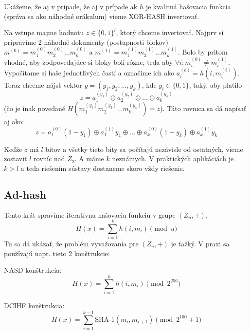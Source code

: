 Ukážeme, že aj v prípade, že aj v prípade ak $h$ je kvalitná hašovacia funkcia
(správa sa ako náhodné orákulum) vieme XOR-HASH invertovať.

Na vstupe majme hodnotu $z \in \{0,1\}^l$, ktorý chceme invertovať.
Najprv si pripravíme 2 náhodné dokumenty (postupnosti blokov)
$m^{(0)} = m_1^{(0)} m_2^{(0)} \dots m_k^{(0)}$ a 
$m^{(1)} = m_1^{(1)} m_2^{(1)} \dots m_k^{(1)}$. Bolo by pritom
vhodné, aby zodpovedajúce si bloky boli rôzne, teda aby $\forall i:
m_i^{(0)} \ne m_i^{(1)}$.
Vypočítame si haše jednotlivých častí a označíme ich ako
$a_i^{(b)} = h(i, m_i^{(b)})$. 
Teraz chceme nájsť vektor $y = (y_1,y_2, \dots ,y_k)$, kde $y_i \in \{0,1\}$,
taký, aby platilo 
\begin{equation*}
    z = a_1^{(y_1)} \oplus a_2^{(y_2)} \oplus \dots \oplus a_k^{(y_k)}
\end{equation*}
(čo je inak povedané $H(m_1^{(y_1)} m_2^{(y_2)} \dots m_k^{(y_k)}) = z$).
Táto rovnica sa dá napísať aj ako:
\begin{equation*}
    z = a_1^{(0)} (1 - y_1) \oplus a_1^{(1)} y_1 \oplus \dots 
        \oplus a_k^{(0)} (1 - y_k) \oplus a_k^{(1)} y_k
\end{equation*}

Keďže $z$ má $l$ bitov a všetky tieto bity sa počítajú nezávisle od
ostatných, vieme zostaviť $l$ rovníc nad $Z_2$. 
A máme $k$ neznámych.
V praktických aplikáciách je $k > l$ 
a teda riešením sústavy dostaneme skoro vždy riešenie.


\subsection{Ad-hash}

Tento krát spravíme iteratívnu hašovaciu funkciu v grupe $(Z_u, +)$.
\begin{equation*}
    H(x) = \sum_{i=1}^k h(i, m_i) \pmod{u}
\end{equation*}
Tu sa dá ukázať, že problém vyvažovania pre $(Z_u, +)$ je ťažký. 
V praxi sa používajú napr. tieto 2 konštrukcie:

NASD konštrukcia:
\begin{equation*}
    H(x) = \sum_{i=1}^k h(i, m_i) \pmod{2^{256}}
\end{equation*}

DCIHF konštrukcia:
\begin{equation*}
    H(x) = \sum_{i=1}^{k-1} \textrm{SHA-1}(m_i, m_{i+1}) \pmod{2^{160}+1}
\end{equation*}

